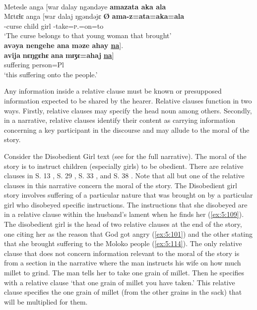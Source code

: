 \ea \label{ex:5:114}\\
Metesle  anga  [war  dalay  ngəndəye  \textbf{amazata  aka  ala}  \\
\gll  Mɛtɛɬɛ  anga    [war    dalaj  ŋgəndəjɛ \textbf{Ø} \textbf{ama-z=ata}\textbf{=aka}\textbf{=ala}\\
      {\NOM}{}-curse   {\POSS}   child    girl       {\DEM}  { } {\DEP}{}-take=\textsc{p}.{\IO}=on=to \\
\glt ‘The curse belongs to that young woman that brought’ \\     
      
\medskip
\textbf{avəya  nengehe  ana  məze  ahay   \underline{na}}].\\
\gll   \textbf{avija}  \textbf{nɛŋgɛhɛ} \textbf{ana} \textbf{mɪʒɛ}\textbf{=ahaj}  \textbf{\underline{na}}]\\
            suffering     {\DEM}      {\DAT}  person=Pl   {\PSP}\\
\glt  ‘this suffering onto the people.’  
\z

Any information inside a relative clause must be known or presupposed information expected to be shared by the hearer. Relative clauses function in two ways. Firstly, relative clauses may specify the head noun among others. Secondly, in a narrative, relative clauses identify their content as carrying information concerning a key participant in the discourse and may allude to the moral of the story. 

Consider the Disobedient Girl text (see  for the full narrative). The moral of the story is to instruct children (especially girls) to be obedient. There are relative clauses in S. 13 , S. 29 , S. 33 , and S. 38 . Note that all but one  of the relative clauses in this narrative concern the moral of the story. The Disobedient girl story involves suffering of a particular nature that was brought on by a particular girl who disobeyed specific instructions. The instructions that she disobeyed are in a relative clause within the husband’s lament when he finds her (\ref{ex:5:109}). The disobedient girl is the head of two relative clauses at the end of the story, one citing her as the reason that God got angry (\ref{ex:5:101}) and the other stating that she brought suffering to the Moloko people (\ref{ex:5:114}). The only relative clause that does not concern information relevant to the moral of the story  is from a section in the narrative where the man instructs his wife on how much millet to grind. The man tells her to take one grain of millet. Then he specifies with a relative clause ‘that one grain of millet you have taken.’ This relative clause specifies the one grain of millet (from the other grains in the sack) that will be multiplied for them. 

